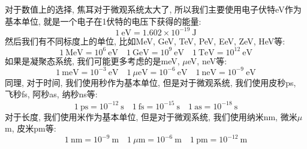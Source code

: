 对于数值上的选择, 焦耳对于微观系统太大了, 所以我们主要使用电子伏特eV作为基本单位, 就是一个电子在1伏特的电压下获得的能量:
\begin{equation}
  1~\mathrm{eV} = 1.602 \times 10^{-19}~\mathrm{J}
\end{equation}
然后我们有不同标度上的单位, 比如MeV, GeV, TeV, PeV, EeV, ZeV, HeV等:
\begin{equation}
  1~\mathrm{MeV} = 10^6~\mathrm{eV} \quad 1~\mathrm{GeV} = 10^9~\mathrm{eV} \quad 1~\mathrm{TeV} = 10^{12}~\mathrm{eV}
\end{equation}
如果是凝聚态系统, 我们可能更多考虑的是meV, $\mu$eV, neV等:
\begin{equation}
  1~\mathrm{meV} = 10^{-3}~\mathrm{eV} \quad 1~\mu\mathrm{eV} = 10^{-6}~\mathrm{eV} \quad 1~\mathrm{neV} = 10^{-9}~\mathrm{eV}
\end{equation}
同理, 对于时间, 我们使用秒作为基本单位, 但是对于微观系统, 我们使用皮秒ps, 飞秒fs, 阿秒as, 纳秒ns等:
\begin{equation}
  1~\mathrm{ps} = 10^{-12}~\mathrm{s} \quad 1~\mathrm{fs} = 10^{-15}~\mathrm{s} \quad 1~\mathrm{as} = 10^{-18}~\mathrm{s}
\end{equation}
对于长度, 我们使用米作为基本单位, 但是对于微观系统, 我们使用纳米nm, 微米$\mu$m, 皮米pm等:
\begin{equation}
  1~\mathrm{nm} = 10^{-9}~\mathrm{m} \quad 1~\mu\mathrm{m} = 10^{-6}~\mathrm{m} \quad 1~\mathrm{pm} = 10^{-12}~\mathrm{m}
\end{equation}


